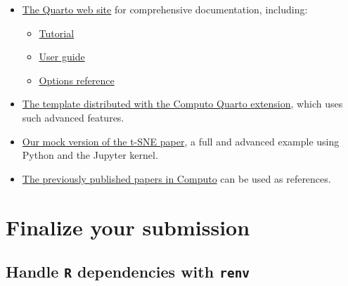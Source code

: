 \documentclass[
  11pt,
  a4paper,
]{article}
\providecommand{\tightlist}{%
  \setlength{\itemsep}{0pt}\setlength{\parskip}{0pt}}\usepackage{longtable,booktabs,array}
\theoremstyle{plain}
\theoremstyle{remark}
\begin{document}
\begin{tcolorbox}[enhanced jigsaw, breakable, toptitle=1mm, arc=.35mm, bottomtitle=1mm, colback=white, colframe=quarto-callout-warning-color-frame, opacitybacktitle=0.6, colbacktitle=quarto-callout-warning-color!10!white, opacityback=0, toprule=.15mm, leftrule=.75mm, left=2mm, title=\textcolor{quarto-callout-warning-color}{\faExclamationTriangle}\hspace{0.5em}{More information}, rightrule=.15mm, titlerule=0mm, bottomrule=.15mm, coltitle=black]

\begin{itemize}
\item
  \href{https://quarto.org}{The Quarto web site} for comprehensive
  documentation, including:

  \begin{itemize}
  \tightlist
  \item
    \href{https://quarto.org/docs/get-started/}{Tutorial}
  \item
    \href{https://quarto.org/docs/guide/}{User guide}
  \item
    \href{https://quarto.org/docs/reference/}{Options reference}
  \end{itemize}
\item
  \href{https://computo.sfds.asso.fr/computo-quarto-extension/}{The
  template distributed with the Computo Quarto extension}, which uses
  such advanced features.
\item
  \href{https://computo.sfds.asso.fr/published-paper-tsne/}{Our mock
  version of the t-SNE paper}, a full and advanced example using Python
  and the Jupyter kernel.
\item
  \href{https://computo.sfds.asso.fr/publications/}{The previously
  published papers in Computo} can be used as references.
\end{itemize}

\end{tcolorbox}

\section{Finalize your submission}\label{finalize-your-submission}

\subsection{\texorpdfstring{Handle \texttt{R} dependencies with
\texttt{renv}}{Handle R dependencies with renv}}\label{handle-r-dependencies-with-renv}
\end{document}

